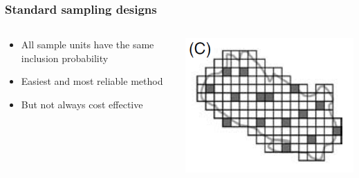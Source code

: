 \documentclass[color=usenames,dvipsnames]{beamer}\usepackage[]{graphicx}\usepackage[]{color}
\begin{document}
\begin{frame}
  \frametitle{Standard sampling designs}
  \large
  {\centering \bf \Large \color{RoyalBlue}{Simple random sampling} \par}
  \vfill
  \begin{columns}
    \large
    \begin{column}{0.6\textwidth}
      \begin{itemize}[<+->]
        \item All sample units have the same inclusion probability
        \item Easiest and most reliable method
        \item But not always cost effective
      \end{itemize}
    \end{column}
    \begin{column}{0.4\textwidth}
      \includegraphics[width=\textwidth]{figs/designC}
    \end{column}
  \end{columns}
\end{frame}


\end{document}
